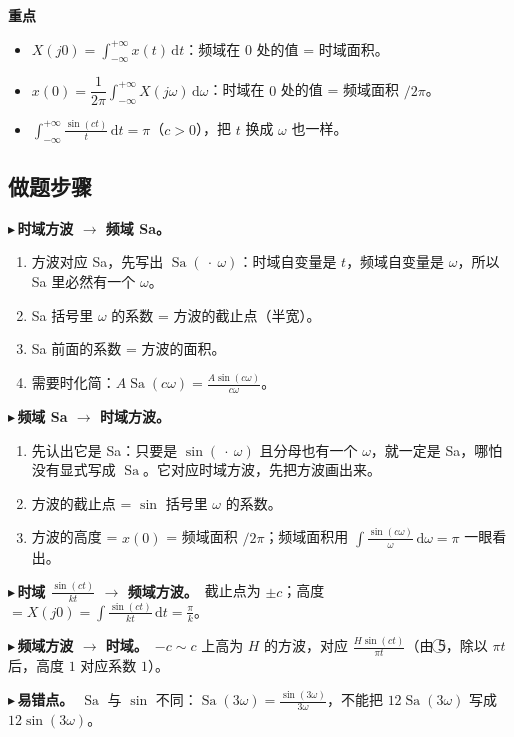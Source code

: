 \documentclass[UTF8,a4paper,11pt]{ctexart}
\newcommand{\Sa}{\operatorname{Sa}}
\newcommand{\dd}{\mathrm{d}}
\newenvironment{remember}{\begin{rememberbox}\textbf{重点}\par\smallskip}{\end{rememberbox}}
\newcounter{ex}[section]
\newcommand{\point}[1]{\par\addvspace{1ex}\noindent\textcolor{ptteal}{$\blacktriangleright$\,\textbf{#1}}\ }
\begin{document}
\begin{remember}
\begin{itemize}[nosep]
\item $X(j0)=\displaystyle\int_{-\infty}^{+\infty}x(t)\,\dd t$：频域在 $0$ 处的值 = 时域面积。
\item $x(0)=\dfrac1{2\pi}\displaystyle\int_{-\infty}^{+\infty}X(j\omega)\,\dd\omega$：时域在 $0$ 处的值 = 频域面积 $/2\pi$。
\item $\displaystyle\int_{-\infty}^{+\infty}\frac{\sin(ct)}{t}\,\dd t=\pi$（$c>0$），把 $t$ 换成 $\omega$ 也一样。
\end{itemize}
\end{remember}

\subsection{做题步骤}\label{sub:steps}
\point{时域方波 $\to$ 频域 Sa。}
\begin{enumerate}[nosep]
\item 方波对应 Sa，先写出 $\Sa(\ \cdot\ \omega)$：时域自变量是 $t$，频域自变量是 $\omega$，所以 Sa 里必然有一个 $\omega$。
\item Sa 括号里 $\omega$ 的系数 = 方波的截止点（半宽）。
\item Sa 前面的系数 = 方波的面积。
\item 需要时化简：$A\Sa(c\omega)=\frac{A\sin(c\omega)}{c\omega}$。
\end{enumerate}

\point{频域 Sa $\to$ 时域方波。}
\begin{enumerate}[nosep]
\item 先认出它是 Sa：只要是 $\sin(\ \cdot\ \omega)$ 且分母也有一个 $\omega$，就一定是 Sa，哪怕没有显式写成 $\Sa$。它对应时域方波，先把方波画出来。
\item 方波的截止点 = $\sin$ 括号里 $\omega$ 的系数。
\item 方波的高度 = $x(0)$ = 频域面积 $/2\pi$；频域面积用 $\int\frac{\sin(c\omega)}{\omega}\,\dd\omega=\pi$ 一眼看出。
\end{enumerate}

\point{时域 $\frac{\sin(ct)}{kt}$ $\to$ 频域方波。}截止点为 $\pm c$；高度 $=X(j0)=\int\frac{\sin(ct)}{kt}\,\dd t=\frac\pi k$。

\point{频域方波 $\to$ 时域。}$-c\sim c$ 上高为 $H$ 的方波，对应 $\frac{H\sin(ct)}{\pi t}$（由 \textcircled{\scriptsize 5}，除以 $\pi t$ 后，高度 $1$ 对应系数 $1$）。

\point{易错点。}$\Sa$ 与 $\sin$ 不同：$\Sa(3\omega)=\frac{\sin(3\omega)}{3\omega}$，不能把 $12\Sa(3\omega)$ 写成 $12\sin(3\omega)$。
\end{document}
